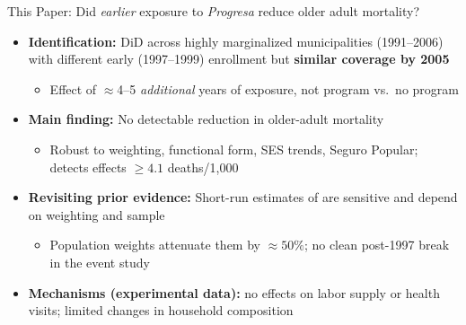 \documentclass[aspectratio=169,usenames,dvipsnames]{beamer}
\begin{document}

\begin{frame}{This Paper: Did \textit{earlier} exposure to \textit{Progresa} reduce older adult mortality?}\label{thispaper}
\vspace{0pt}
\small
\begin{itemize}
  \item[$\circ$] \textbf{Identification:} DiD across highly marginalized municipalities (1991--2006) with different early (1997--1999) enrollment but \textbf{similar coverage by 2005}
    \begin{itemize}
      \item Effect of $\approx$4--5 \textit{additional} years of exposure, not program vs.\ no program
    \end{itemize}
  \vspace{2pt}
  \item[$\circ$] \textbf{Main finding:} \textcolor{redUT}{No detectable reduction in older-adult mortality}
    \begin{itemize}
      \item Robust to weighting, functional form, SES trends, Seguro Popular; detects effects $\geq 4.1$ deaths/1,000
    \end{itemize}
  \vspace{2pt}
  \item[$\circ$] \textbf{Revisiting prior evidence:} Short-run estimates of \cite{BarhamRowberry2013JDE} are sensitive and depend on weighting and sample
    \begin{itemize}
      \item Population weights attenuate them by $\approx 50\%$; no clean post-1997 break in the event study
    \end{itemize}
  \vspace{2pt}
  \item[$\circ$] \textbf{Mechanisms (experimental data):} no effects on labor supply or health visits; limited changes in household composition
\end{itemize}
\end{frame}
\end{document}
